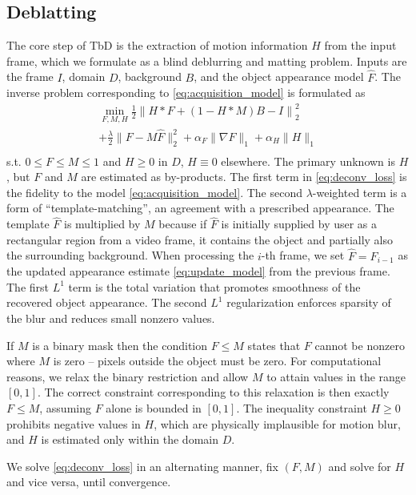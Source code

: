 \documentclass[10pt,twocolumn,letterpaper]{article}
\begin{document}
\subsection{Deblatting}
\label{sec:deblurring}
The core step of TbD is the extraction of motion information $H$ from the input frame, which we formulate as a blind deblurring and matting problem. Inputs are the frame $I$, domain $D$, background $B$, and the object appearance model $\hat F$. The inverse problem corresponding to \eqref{eq:acquisition_model} is formulated as
\begin{equation}
	\label{eq:deconv_loss}
	\begin{gathered}
	\min_{F,M,H} \frac{1}{2}\left\|H*F+(1-H*M)B-I\right\|_2^2 \\
	+\frac{\lambda}{2}\|F-M\hat F\|_2^2+\alpha_F\|\nabla F\|_1+\alpha_H\|H\|_1\\
\end{gathered}
\end{equation}
s.t. $0\leq F\leq M\leq 1$ and $H\geq 0$ in $D$, $H\equiv 0$ elsewhere.
The primary unknown is $H$, but $F$ and $M$ are estimated as by-products. The first term in \eqref{eq:deconv_loss} is the fidelity to the model \eqref{eq:acquisition_model}. The second $\lambda$-weighted term is a form of ``template-matching'', an agreement with a prescribed appearance. The template $\hat{F}$ is multiplied by $M$ because if $\hat F$ is initially supplied by user as a rectangular region from a video frame, it contains the object and partially also the surrounding background. 
When processing the $i$-th frame,
we set $\hat F=F_{i-1}$ as the updated appearance estimate \eqref{eq:update_model} from the previous frame. The first $L^1$ term is the total variation that promotes smoothness of the recovered object appearance. The second $L^1$ regularization enforces sparsity of the blur and reduces small nonzero values.

If $M$ is a binary mask then the condition $F\leq M$ states that $F$ cannot be nonzero where $M$ is zero -- pixels outside the object must be zero. For computational reasons, we relax the binary restriction and allow $M$ to attain values in the range $[0,1]$. The correct constraint corresponding to this relaxation is then exactly $F\leq M$, assuming $F$ alone is bounded in $[0,1]$. The inequality constraint $H\geq 0$ prohibits negative values in $H$, which are physically implausible for motion blur, and $H$ is estimated only within the domain $D$.

We solve \eqref{eq:deconv_loss} in an alternating manner, fix $(F,M)$ and solve for $H$ and vice versa,
until convergence.
\end{document}
